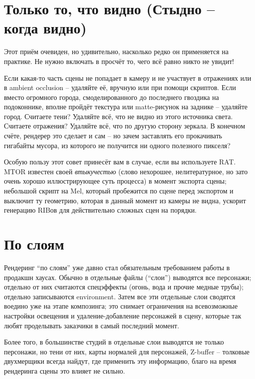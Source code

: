   \section*{Только то, что видно (Стыдно – когда видно)}
  

 Этот приём очевиден, но удивительно, насколько
    редко он применяется на практике. Не нужно включать в просчёт то,
    чего всё равно никто не увидит!
  

 Если какая-то часть сцены не попадает в камеру и не
    участвует в отражениях или в ambient occlusion – удаляйте её,
    вручную или при помощи скриптов. Если вместо огромного города,
    смоделированного до последнего гвоздика на подоконнике, вполне
    пройдёт текстура или matte-рисунок на заднике – удаляйте город.
    Считаете тени? Удаляйте всё, что не видно из этого источника света.
    Считаете отражения? Удаляйте всё, что по другую сторону зеркала. В
    конечном счёте, рендерер это сделает и сам – но зачем заставлять
    его прокачивать гигабайты мусора, из которого не получится ни
    одного полезного пикселя?
  

 Особую пользу этот совет принесёт вам в случае,
    если вы используете RAT. MTOR известен своей {\it втыкучестью} (слово нехорошее,
    нелитературное, но зато очень хорошо иллюстрирующее суть процесса)
    в момент экспорта сцены; небольшой скрипт на Mel, который
    пробежится по сцене перед экспортом и выключит ту геометрию,
    которая в данный момент из камеры не видна, ускорит генерацию RIBов
    для действительно сложных сцен  на порядки.
  
\section*{По слоям}
  

 Рендеринг “по слоям” уже давно стал обязательным
    требованием работы в продакшн хаусах. Обычно в отдельные файлы
    (“слои”) выводятся все персонажи; отдельно от них считаются
    спецэффекты (огонь, вода и прочие медные трубы); отдельно
    записываются environment. Затем все эти отдельные слои сводятся
    воедино уже на этапе композинга; это снимает ограничения на
    всевозможные настройки освещения и удаление-добавление персонажей в
    сцену, которые так любят проделывать заказчики в самый последний
    момент.
  

 Более того, в большинстве студий в отдельные слои
    выводятся не только персонажи, но тени от них, карты нормалей для
    персонажей, Z-buffer – толковые двухмерщики всегда найдут, где
    применить эту информацию, благо на время рендеринга сцены это
    влияет не сильно.
  

